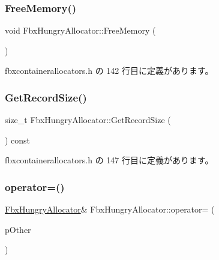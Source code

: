 \subsubsection{\texorpdfstring{Free\+Memory()}{FreeMemory()}}
{\footnotesize\ttfamily void Fbx\+Hungry\+Allocator\+::\+Free\+Memory (\begin{DoxyParamCaption}\item[{void $\ast$}]{ }\end{DoxyParamCaption})\hspace{0.3cm}{\ttfamily [inline]}}



 fbxcontainerallocators.\+h の 142 行目に定義があります。

\mbox{\label{class_fbx_hungry_allocator_a6aa8fde93ff214d3313ec29abe6b2eb2}} 
\subsubsection{\texorpdfstring{Get\+Record\+Size()}{GetRecordSize()}}
{\footnotesize\ttfamily size\+\_\+t Fbx\+Hungry\+Allocator\+::\+Get\+Record\+Size (\begin{DoxyParamCaption}{ }\end{DoxyParamCaption}) const\hspace{0.3cm}{\ttfamily [inline]}}



 fbxcontainerallocators.\+h の 147 行目に定義があります。

\mbox{\label{class_fbx_hungry_allocator_a692a8e4e268a60d82be5469e6e8c232f}} 
\subsubsection{\texorpdfstring{operator=()}{operator=()}}
{\footnotesize\ttfamily \hyperlink{class_fbx_hungry_allocator}{Fbx\+Hungry\+Allocator}\& Fbx\+Hungry\+Allocator\+::operator= (\begin{DoxyParamCaption}\item[{const \hyperlink{class_fbx_hungry_allocator}{Fbx\+Hungry\+Allocator} \&}]{p\+Other }\end{DoxyParamCaption})\hspace{0.3cm}{\ttfamily [inline]}}



